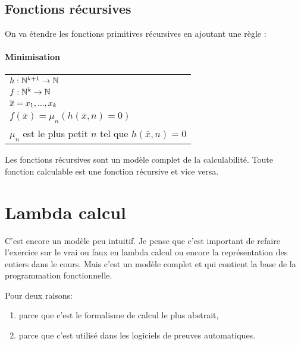 \subsection{Fonctions récursives}
\label{ssub:fonctions_r_cursives}
On va étendre les fonctions primitives récursives en ajoutant une règle :

\paragraph{Minimisation}
\begin{tabular}{|l|}
	\hline
	$h: \mathbb{N}^{k+1} \rightarrow \mathbb{N}$\\
	$f: \mathbb{N}^{k} \rightarrow \mathbb{N}$\\
	$\overline{x} =x_1,...,x_k$ \\
	$f(\overline{x}) = \mu_n (h(\overline{x}, n) = 0)$\\
	$\mu_n$ est le plus petit $n$ tel que $h(\overline{x}, n) = 0$ \\
	\hline
\end{tabular}

\begin{myprop}
	Les fonctions récursives sont un modèle complet de la calculabilité.
	Toute fonction calculable est une fonction récursive et vice versa.
\end{myprop}

\section{Lambda calcul}
\label{sub:lambda_calcul}
\begin{myrem}%
	C'est encore un modèle peu intuitif. Je pense que c'est important
	de refaire l'exercice sur le vrai ou faux en lambda calcul ou encore la
	représentation des entiers dans le cours. Mais c'est un modèle complet
	et qui contient la base de la programmation fonctionnelle.
\end{myrem}

\begin{myrem}
	Pour deux raisons:
	\begin{enumerate}
		\item parce que c'est le formalisme de calcul le plus abstrait,
		\item parce que c'est utilisé dans les logiciels de preuves automatiques.
	\end{enumerate}
\end{myrem}

